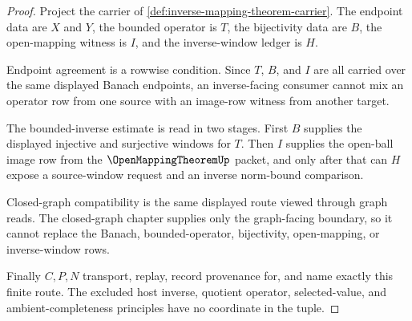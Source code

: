 \begin{proof}
Project the carrier of \autoref{def:inverse-mapping-theorem-carrier}. The endpoint data are $X$ and $Y$, the bounded operator is $T$, the bijectivity data are $B$, the open-mapping witness is $I$, and the inverse-window ledger is $H$.

Endpoint agreement is a rowwise condition. Since $T$, $B$, and $I$ are all carried over the same displayed Banach endpoints, an inverse-facing consumer cannot mix an operator row from one source with an image-row witness from another target.

The bounded-inverse estimate is read in two stages. First $B$ supplies the displayed injective and surjective windows for $T$. Then $I$ supplies the open-ball image row from the $\OpenMappingTheoremUp$ packet, and only after that can $H$ expose a source-window request and an inverse norm-bound comparison.

Closed-graph compatibility is the same displayed route viewed through graph reads. The closed-graph chapter supplies only the graph-facing boundary, so it cannot replace the Banach, bounded-operator, bijectivity, open-mapping, or inverse-window rows.

Finally $C,P,N$ transport, replay, record provenance for, and name exactly this finite route. The excluded host inverse, quotient operator, selected-value, and ambient-completeness principles have no coordinate in the tuple.
\end{proof}

\begin{closurestatus}{\InverseMappingTheoremUp}
  \theoryclosure{\seedClosure}
  \formalstatus{\unformalizedV}
\end{closurestatus}
